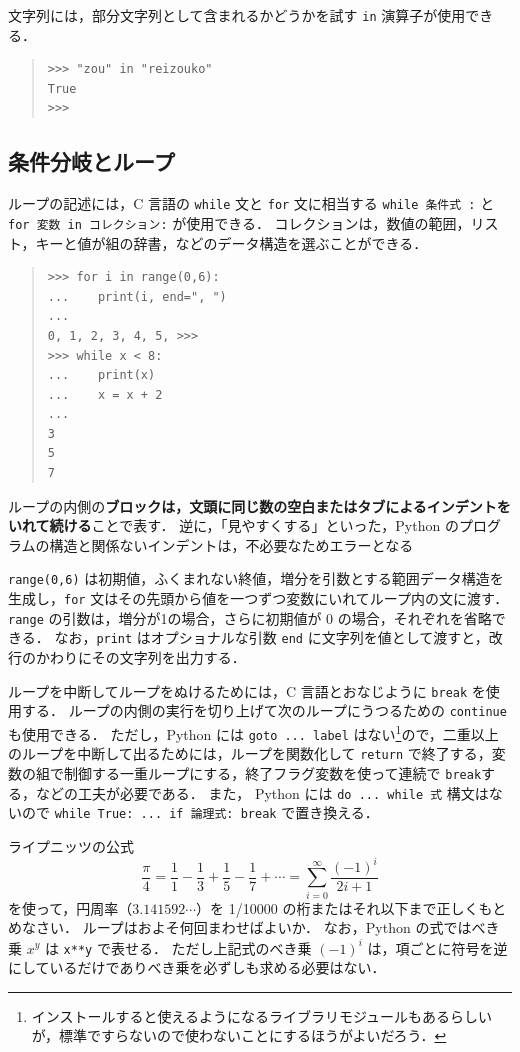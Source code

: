 \documentclass[11pt,a4,epsf]{article}
\begin{document}
文字列には，部分文字列として含まれるかどうかを試す \verb+in+ 演算子が使用できる．
\begin{quote}
\small
\begin{verbatim}
>>> "zou" in "reizouko"
True
>>>\end{verbatim}
\end{quote}

\subsection{条件分岐とループ}

ループの記述には，C 言語の \verb+while+ 文と \verb+for+ 文に相当する \verb+while 条件式 :+ と \verb+for 変数 in コレクション:+ が使用できる．
コレクションは，数値の範囲，リスト，キーと値が組の辞書，などのデータ構造を選ぶことができる．
\begin{quote}
\small
\begin{verbatim}
>>> for i in range(0,6):
...    print(i, end=", ")
...
0, 1, 2, 3, 4, 5, >>>
>>> while x < 8:
...    print(x)
...    x = x + 2
...
3
5
7
\end{verbatim}
\end{quote}
ループの内側の{\bf ブロックは，文頭に同じ数の空白またはタブによるインデントをいれて続ける}ことで表す．
逆に，「見やすくする」といった，Python のプログラムの構造と関係ないインデントは，不必要なためエラーとなる

\verb+range(0,6)+ は初期値，ふくまれない終値，増分を引数とする範囲データ構造を生成し，\verb+for+ 文はその先頭から値を一つずつ変数にいれてループ内の文に渡す．
\verb+range+ の引数は，増分が1の場合，さらに初期値が 0 の場合，それぞれを省略できる．
なお，\verb+print+ はオプショナルな引数 \verb+end+ に文字列を値として渡すと，改行のかわりにその文字列を出力する．

ループを中断してループをぬけるためには，C 言語とおなじように \verb+break+ を使用する．
ループの内側の実行を切り上げて次のループにうつるための \verb+continue+ も使用できる．
ただし，Python には \verb+goto ... label+ はない\footnote{インストールすると使えるようになるライブラリモジュールもあるらしいが，標準ですらないので使わないことにするほうがよいだろう．}ので，二重以上のループを中断して出るためには，ループを関数化して \verb+return+ で終了する，変数の組で制御する一重ループにする，終了フラグ変数を使って連続で \verb+break+する，などの工夫が必要である．
また， Python には \verb+do ... while 式+ 構文はないので \verb+while True: ... if 論理式: break+ で置き換える．

\begin{excercise}
ライプニッツの公式
\[
\frac{\pi}{4} = \frac{1}{1} - \frac{1}{3} + \frac{1}{5} - \frac{1}{7} + \cdots = \sum_{i=0}^{\infty}\frac{(-1)^i}{2i+1}
\]
を使って，円周率（$3.141592\cdots$）を 1/10000 の桁またはそれ以下まで正しくもとめなさい．
ループはおよそ何回まわせばよいか．
なお，Python の式ではべき乗 $x^y$ は \verb+x**y+ で表せる．
ただし上記式のべき乗 $(-1)^i$ は，項ごとに符号を逆にしているだけでありべき乗を必ずしも求める必要はない．
\end{excercise}
\end{document}
